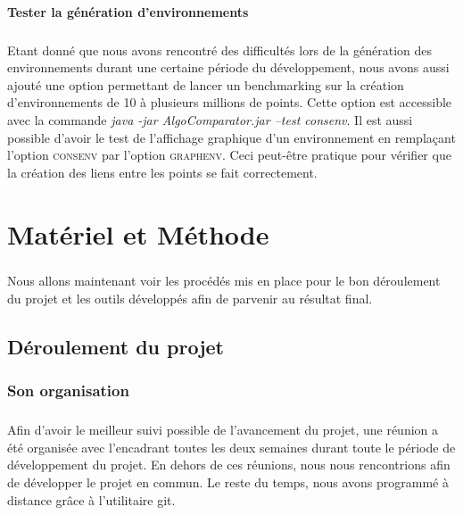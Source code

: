 \documentclass[pidr]{tnreport}
\begin{document}
			\subsubsection{Tester la génération d'environnements}

\paragraph{}
Etant donné que nous avons rencontré des difficultés lors de la génération des environnements durant une certaine période du développement, nous avons aussi ajouté une option permettant de lancer un benchmarking sur la création d'environnements de 10 à plusieurs millions de points. Cette option est accessible avec la commande \emph{java -jar AlgoComparator.jar --test consenv}. \linebreak
Il est aussi possible d'avoir le test de l'affichage graphique d'un environnement en remplaçant l'option \textsc{consenv} par l'option \textsc{graphenv}. Ceci peut-être pratique pour vérifier que la création des liens entre les points se fait correctement.

\clearpage

\chapter{Matériel et Méthode}

\paragraph{}
Nous allons maintenant voir les procédés mis en place pour le bon déroulement du projet et les outils développés afin de parvenir au résultat final.

	\section{Déroulement du projet}

		\subsection{Son organisation}

\paragraph{}
Afin d'avoir le meilleur suivi possible de l'avancement du projet, une réunion a été organisée avec l'encadrant toutes les deux semaines durant toute le période de développement du projet. En dehors de ces réunions, nous nous rencontrions afin de développer le projet en commun. Le reste du temps, nous avons programmé à distance grâce à l'utilitaire git.
\end{document}
